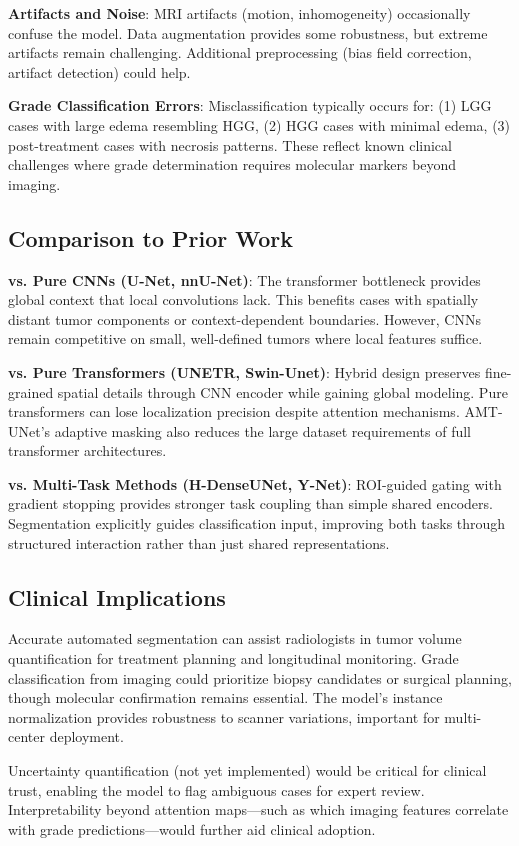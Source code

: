 \textbf{Artifacts and Noise}: MRI artifacts (motion, inhomogeneity) occasionally confuse the model. Data augmentation provides some robustness, but extreme artifacts remain challenging. Additional preprocessing (bias field correction, artifact detection) could help.

\textbf{Grade Classification Errors}: Misclassification typically occurs for: (1) LGG cases with large edema resembling HGG, (2) HGG cases with minimal edema, (3) post-treatment cases with necrosis patterns. These reflect known clinical challenges where grade determination requires molecular markers beyond imaging.

\subsection{Comparison to Prior Work}

\textbf{vs. Pure CNNs (U-Net, nnU-Net)}: The transformer bottleneck provides global context that local convolutions lack. This benefits cases with spatially distant tumor components or context-dependent boundaries. However, CNNs remain competitive on small, well-defined tumors where local features suffice.

\textbf{vs. Pure Transformers (UNETR, Swin-Unet)}: Hybrid design preserves fine-grained spatial details through CNN encoder while gaining global modeling. Pure transformers can lose localization precision despite attention mechanisms. AMT-UNet's adaptive masking also reduces the large dataset requirements of full transformer architectures.

\textbf{vs. Multi-Task Methods (H-DenseUNet, Y-Net)}: ROI-guided gating with gradient stopping provides stronger task coupling than simple shared encoders. Segmentation explicitly guides classification input, improving both tasks through structured interaction rather than just shared representations.

\subsection{Clinical Implications}

Accurate automated segmentation can assist radiologists in tumor volume quantification for treatment planning and longitudinal monitoring. Grade classification from imaging could prioritize biopsy candidates or surgical planning, though molecular confirmation remains essential. The model's instance normalization provides robustness to scanner variations, important for multi-center deployment.

Uncertainty quantification (not yet implemented) would be critical for clinical trust, enabling the model to flag ambiguous cases for expert review. Interpretability beyond attention maps—such as which imaging features correlate with grade predictions—would further aid clinical adoption.
